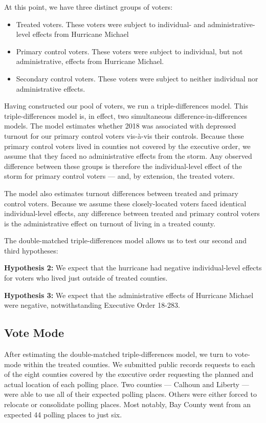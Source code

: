 \documentclass[
  12pt,
]{article}
\providecommand{\tightlist}{%
  \setlength{\itemsep}{0pt}\setlength{\parskip}{0pt}}
\begin{document}
At this point, we have three distinct groups of voters:

\begin{itemize}
\tightlist
\item
  Treated voters. These voters were subject to individual- and administrative-level effects from Hurricane Michael
\item
  Primary control voters. These voters were subject to individual, but not administrative, effects from Hurricane Michael.
\item
  Secondary control voters. These voters were subject to neither individual nor administrative effects.
\end{itemize}

Having constructed our pool of voters, we run a triple-differences model. This triple-differences model is, in effect, two simultaneous difference-in-differences models. The model estimates whether 2018 was associated with depressed turnout for our primary control voters vis-à-vis their controls. Because these primary control voters lived in counties not covered by the executive order, we assume that they faced no administrative effects from the storm. Any observed difference between these groups is therefore the individual-level effect of the storm for primary control voters --- and, by extension, the treated voters.

The model also estimates turnout differences between treated and primary control voters. Because we assume these closely-located voters faced identical individual-level effects, any difference between treated and primary control voters is the administrative effect on turnout of living in a treated county.

The double-matched triple-differences model allows us to test our second and third hypotheses:

\textbf{Hypothesis 2:} We expect that the hurricane had negative individual-level effects for voters who lived just outside of treated counties.

\textbf{Hypothesis 3:} We expect that the administrative effects of Hurricane Michael were negative, notwithstanding Executive Order 18-283.

\hypertarget{vote-mode}{%
\subsection*{Vote Mode}\label{vote-mode}}

After estimating the double-matched triple-differences model, we turn to vote-mode within the treated counties. We submitted public records requests to each of the eight counties covered by the executive order requesting the planned and actual location of each polling place. Two counties --- Calhoun and Liberty --- were able to use all of their expected polling places. Others were either forced to relocate or consolidate polling places. Most notably, Bay County went from an expected 44 polling places to just six.
\end{document}
